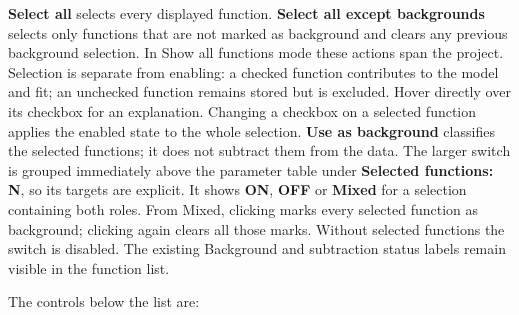 \documentclass[
  10pt,
  a4paper,
  oneside]{scrreprt}
\begin{document}
\textbf{Select all} selects every displayed function. \textbf{Select all
except backgrounds} selects only functions that are not marked as
background and clears any previous background selection. In Show all
functions mode these actions span the project. Selection is separate
from enabling: a checked function contributes to the model and fit; an
unchecked function remains stored but is excluded. Hover directly over
its checkbox for an explanation. Changing a checkbox on a selected
function applies the enabled state to the whole selection. \textbf{Use
as background} classifies the selected functions; it does not subtract
them from the data. The larger switch is grouped immediately above the
parameter table under \textbf{Selected functions: N}, so its targets are
explicit. It shows \textbf{ON}, \textbf{OFF} or \textbf{Mixed} for a
selection containing both roles. From Mixed, clicking marks every
selected function as background; clicking again clears all those marks.
Without selected functions the switch is disabled. The existing
Background and subtraction status labels remain visible in the function
list.

The controls below the list are:
\end{document}
